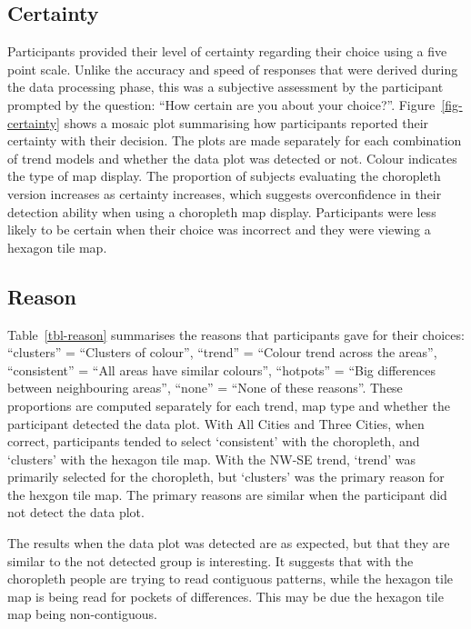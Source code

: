\documentclass[
doublespace,
  times]{anzsauth}
\begin{document}
\subsection{Certainty}\label{certainty}

Participants provided their level of certainty regarding their choice
using a five point scale. Unlike the accuracy and speed of responses
that were derived during the data processing phase, this was a
subjective assessment by the participant prompted by the question: ``How
certain are you about your choice?''. Figure~\ref{fig-certainty} shows a
mosaic plot summarising how participants reported their certainty with
their decision. The plots are made separately for each combination of
trend models and whether the data plot was detected or not. Colour
indicates the type of map display. The proportion of subjects evaluating
the choropleth version increases as certainty increases, which suggests
overconfidence in their detection ability when using a choropleth map
display. Participants were less likely to be certain when their choice
was incorrect and they were viewing a hexagon tile map.

\subsection{Reason}\label{reason}

Table~\ref{tbl-reason} summarises the reasons that participants gave for
their choices: ``clusters'' = ``Clusters of colour'', ``trend'' =
``Colour trend across the areas'', ``consistent'' = ``All areas have
similar colours'', ``hotpots'' = ``Big differences between neighbouring
areas'', ``none'' = ``None of these reasons''. These proportions are
computed separately for each trend, map type and whether the participant
detected the data plot. With All Cities and Three Cities, when correct,
participants tended to select `consistent' with the choropleth, and
`clusters' with the hexagon tile map. With the NW-SE trend, `trend' was
primarily selected for the choropleth, but `clusters' was the primary
reason for the hexgon tile map. The primary reasons are similar when the
participant did not detect the data plot.

The results when the data plot was detected are as expected, but that
they are similar to the not detected group is interesting. It suggests
that with the choropleth people are trying to read contiguous patterns,
while the hexagon tile map is being read for pockets of differences.
This may be due the hexagon tile map being non-contiguous.
\end{document}
